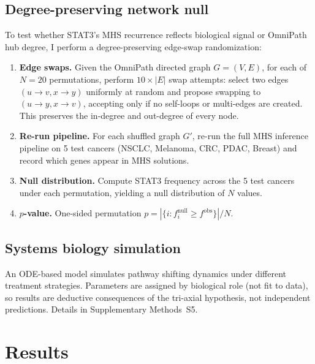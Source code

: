 \documentclass[11pt]{article}
\begin{document}
\subsection*{Degree-preserving network null}
To test whether STAT3's MHS recurrence reflects biological signal or OmniPath hub degree, I perform a degree-preserving edge-swap randomization:
\begin{enumerate}
\item \textbf{Edge swaps.} Given the OmniPath directed graph $G = (V, E)$, for each of $N = 20$ permutations, perform $10 \times |E|$ swap attempts: select two edges $(u \to v, x \to y)$ uniformly at random and propose swapping to $(u \to y, x \to v)$, accepting only if no self-loops or multi-edges are created. This preserves the in-degree and out-degree of every node.
\item \textbf{Re-run pipeline.} For each shuffled graph $G'$, re-run the full MHS inference pipeline on 5 test cancers (NSCLC, Melanoma, CRC, PDAC, Breast) and record which genes appear in MHS solutions.
\item \textbf{Null distribution.} Compute STAT3 frequency across the 5 test cancers under each permutation, yielding a null distribution of $N$ values.
\item \textbf{$p$-value.} One-sided permutation $p = |\{i : f_i^{\text{null}} \geq f^{\text{obs}}\}| / N$.
\end{enumerate}

\subsection*{Systems biology simulation}
An ODE-based model simulates pathway shifting dynamics under different treatment strategies. Parameters are assigned by biological role (not fit to data), so results are deductive consequences of the tri-axial hypothesis, not independent predictions. Details in Supplementary Methods~S5.

\section*{Results}
\end{document}
